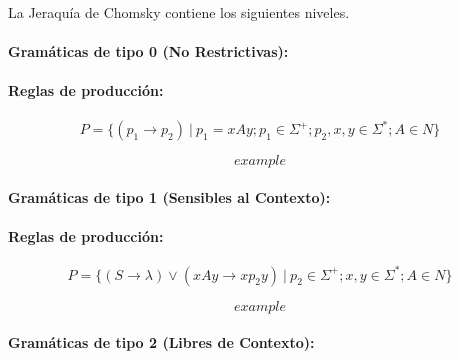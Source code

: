 {La Jeraquía de Chomsky contiene los
siguientes niveles.

\paragraph*{Gramáticas de tipo 0 (No Restrictivas):}

\paragraph*{Reglas de producción:}

\begin{equation}
P = \{(p_1 \rightarrow p_2)\ |\ p_1 = xAy; p_1 \in \Sigma^+; p_2,x,y \in
\Sigma^*; A \in N\} 
\end{equation}

\ejem 

\begin{equation}
example
\end{equation}

\paragraph*{Gramáticas de tipo 1 (Sensibles al Contexto):}

\paragraph*{Reglas de producción:}

\begin{equation}
P = \{(S \rightarrow \lambda) \vee (xAy \rightarrow xp_2y)\ |\ p_2 \in \Sigma^+;
x,y \in \Sigma^*; A \in N\} 
\end{equation}

\ejem 

\begin{equation}
example
\end{equation}

\paragraph*{Gramáticas de tipo 2 (Libres de Contexto):}

}

